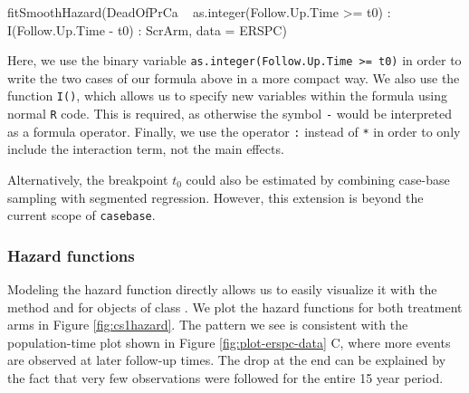 \begin{Schunk}
\begin{Sinput}
fitSmoothHazard(DeadOfPrCa ~ as.integer(Follow.Up.Time >= t0) :
                    I(Follow.Up.Time - t0) : ScrArm,
                data = ERSPC)
\end{Sinput}
\end{Schunk}

\noindent Here, we use the binary variable
\texttt{as.integer(Follow.Up.Time\ \textgreater{}=\ t0)} in order to
write the two cases of our formula above in a more compact way. We also
use the function \texttt{I()}, which allows us to specify new variables
within the formula using normal \texttt{R} code. This is required, as
otherwise the symbol \texttt{-} would be interpreted as a formula
operator. Finally, we use the operator \texttt{:} instead of \texttt{*}
in order to only include the interaction term, not the main effects.

Alternatively, the breakpoint \(t_0\) could also be estimated by
combining case-base sampling with segmented regression. However, this
extension is beyond the current scope of \texttt{casebase}.

\hypertarget{hazard-functions}{%
\subsubsection{Hazard functions}\label{hazard-functions}}

Modeling the hazard function directly allows us to easily visualize it
with the  method and  for objects of
class . We plot the hazard functions for both
treatment arms in Figure \ref{fig:cs1hazard}. The pattern we see is
consistent with the population-time plot shown in Figure
\ref{fig:plot-erspc-data} C, where more events are observed at later
follow-up times. The drop at the end can be explained by the fact that
very few observations were followed for the entire 15 year period.

